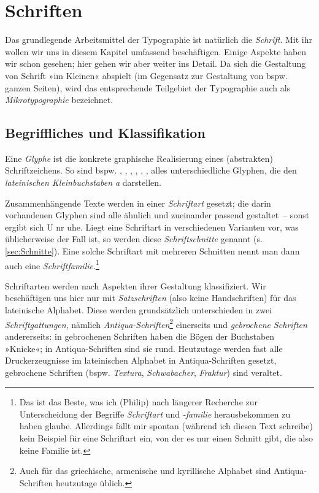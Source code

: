 \chapter{Schriften}
\label{ch:Schriften}

Das grundlegende Arbeitsmittel der Typographie ist natürlich die
\emph{Schrift}.  Mit ihr wollen wir uns in diesem Kapitel umfassend
beschäftigen.  Einige Aspekte haben wir schon gesehen; hier gehen wir
aber weiter ins Detail.  Da sich die Gestaltung von Schrift »im
Kleinen« abspielt (im Gegensatz zur Gestaltung von bspw. ganzen
Seiten), wird das entsprechende Teilgebiet der Typographie auch als
\emph{Mikrotypographie} bezeichnet.

\section{Begriffliches und Klassifikation}

Eine \emph{Glyphe} ist die konkrete graphische Realisierung eines
(abstrakten) Schriftzeichens.  So sind bspw. ,
, , ,
, ,  alles
unterschiedliche Glyphen, die den \emph{lateinischen Kleinbuchstaben
  a} darstellen.

Zusammenhängende Texte werden in einer \emph{Schriftart} gesetzt; die
darin vorhandenen Glyphen sind alle ähnlich und zueinander passend
gestaltet~-- sonst ergibt sich {U\selectfont
  n\selectfont r\selectfont
  u\selectfont h\selectfont e}.  Liegt
eine Schriftart in verschiedenen Varianten vor, was üblicherweise der
Fall ist, so werden diese \emph{Schriftschnitte} genannt
(s. \cref{sec:Schnitte}).  Eine solche Schriftart mit mehreren
Schnitten nennt man dann auch eine \emph{Schriftfamilie}.\footnote{Das
  ist das Beste, was ich (Philip) nach längerer Recherche zur
  Unterscheidung der Begriffe \emph{Schriftart} und \emph{-familie}
  herausbekommen zu haben glaube.  Allerdings fällt mir spontan
  (während ich diesen Text schreibe) kein Beispiel für eine Schriftart
  ein, von der es nur einen Schnitt gibt, die also keine Familie ist.}

Schriftarten werden nach Aspekten ihrer Gestaltung klassifiziert.  Wir
beschäftigen uns hier nur mit \emph{Satzschriften} (also keine
Handschriften) für das lateinische Alphabet.  Diese werden
grundsätzlich unterschieden in zwei \emph{Schriftgattungen}, nämlich
\emph{Antiqua-Schriften}\footnote{Auch für das griechische, armenische
  und kyrillische Alphabet sind Antiqua-Schriften heutzutage üblich.}
einerseits und \emph{gebrochene Schriften} andererseits: in
gebrochenen Schriften haben die Bögen der Buchstaben »Knicke«; in
Antiqua-Schriften sind sie rund.  Heutzutage werden fast alle
Druckerzeugnisse im lateinischen Alphabet in Antiqua-Schriften
gesetzt, gebrochene Schriften (bspw. \emph{Textura},
\emph{Schwabacher}, \emph{Fraktur}) sind veraltet.

